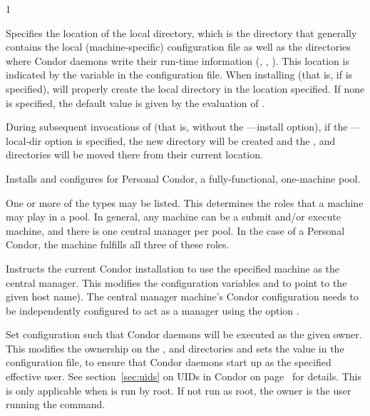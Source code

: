 \begin{ManPage}{\label{man-condor-configure}}{1}
\begin{Options}
	 {Specifies the
	location of the local directory, which is the directory that generally 
	contains the local (machine-specific) configuration file as well as the
	directories where Condor daemons write their run-time information 
	(, , ).
	This location is indicated  by the  
	variable in the configuration file. 
	When installing (that is, if  is specified),
	will properly create the local directory in the location specified.
	If none is specified, the default value is given by the evaluation of
        .

	During subsequent invocations of 
	(that is, without the ---install option),
	if the ---local-dir option is specified, the new directory
	will be created and the ,  and  
	directories will be moved there from their current location.}

	 {Installs and configures for 
	 Personal Condor, a fully-functional, one-machine pool.}

	 {One
	or more of the types may be listed.
	This determines the roles that a machine may play in a pool.
	In general, any machine can be a submit and/or execute machine,
	and there is one central manager per pool.
	In the case of a Personal Condor,
	the machine fulfills all three of these roles.}

	 {Instructs
	the current Condor installation to use the specified machine
	as the central manager. 
	This modifies the configuration variables 
	and  to point to the given host name).
	The central manager machine's Condor configuration needs
	to be independently configured to 
	act as a manager using the option . }

	 {Set configuration
	such that Condor daemons will be executed as the given owner.
	This modifies the 
	ownership on the ,  and 
	directories and sets the  value
	in the configuration file,
	to ensure that Condor daemons start up as the specified effective user.
	See section~\ref{sec:uids} on
        UIDs in Condor on page~\pageref{sec:uids} for details.
	This is only applicable when  is run by root.
	If not run as root, the owner is the user running
	the  command.  }


\end{Options}
\end{ManPage}
